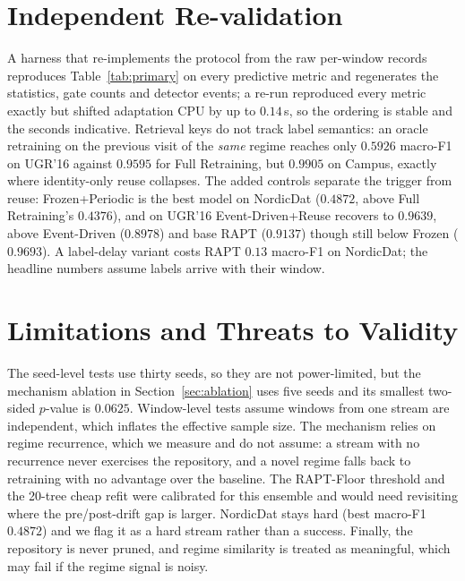 \documentclass[conference]{IEEEtran}
\begin{document}
\section{Independent Re-validation}
\label{sec:revalidation}
A harness that re-implements the protocol from the raw per-window records reproduces
Table~\ref{tab:primary} on every predictive metric and regenerates the statistics, gate
counts and detector events; a re-run reproduced every metric exactly but shifted
adaptation CPU by up to $0.14$\,s, so the ordering is stable and the seconds indicative.
Retrieval keys do not track label semantics: an oracle retraining on the previous visit of
the \emph{same} regime reaches only $0.5926$ macro-F1 on UGR'16 against $0.9595$ for Full
Retraining, but $0.9905$ on Campus, exactly where identity-only reuse collapses. The added
controls separate the trigger from reuse: Frozen+Periodic is the best model on NordicDat
($0.4872$, above Full Retraining's $0.4376$), and on UGR'16 Event-Driven+Reuse recovers to
$0.9639$, above Event-Driven ($0.8978$) and base RAPT ($0.9137$) though still below Frozen
($0.9693$). A label-delay variant costs RAPT $0.13$
macro-F1 on NordicDat; the headline numbers assume labels arrive with their window.


\section{Limitations and Threats to Validity}
\label{sec:limitations}
The seed-level tests use thirty seeds, so they are not power-limited, but the mechanism
ablation in Section~\ref{sec:ablation} uses five seeds and its smallest two-sided
$p$-value is $0.0625$. Window-level tests assume windows from one stream are independent,
which inflates the effective sample size. The mechanism relies on regime recurrence, which
we measure and do not assume: a stream with no recurrence never exercises the repository,
and a novel regime falls back to retraining with no advantage over the baseline. The
RAPT-Floor threshold and the 20-tree cheap refit were calibrated for this ensemble and
would need revisiting where the pre/post-drift gap is larger. NordicDat stays hard (best
macro-F1 $0.4872$) and we flag it as a hard stream rather than a success. Finally, the
repository is never pruned, and regime similarity is treated as meaningful, which may fail
if the regime signal is noisy.
\end{document}
